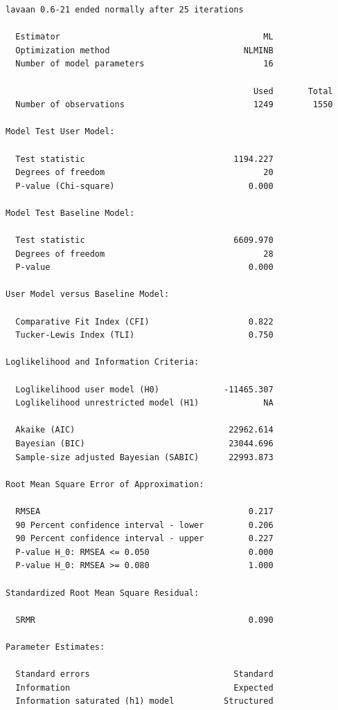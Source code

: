 \documentclass[
  letterpaper,
  DIV=11,
  numbers=noendperiod]{scrartcl}
\begin{document}
\begin{verbatim}
lavaan 0.6-21 ended normally after 25 iterations

  Estimator                                         ML
  Optimization method                           NLMINB
  Number of model parameters                        16

                                                  Used       Total
  Number of observations                          1249        1550

Model Test User Model:
                                                      
  Test statistic                              1194.227
  Degrees of freedom                                20
  P-value (Chi-square)                           0.000

Model Test Baseline Model:

  Test statistic                              6609.970
  Degrees of freedom                                28
  P-value                                        0.000

User Model versus Baseline Model:

  Comparative Fit Index (CFI)                    0.822
  Tucker-Lewis Index (TLI)                       0.750

Loglikelihood and Information Criteria:

  Loglikelihood user model (H0)             -11465.307
  Loglikelihood unrestricted model (H1)             NA
                                                      
  Akaike (AIC)                               22962.614
  Bayesian (BIC)                             23044.696
  Sample-size adjusted Bayesian (SABIC)      22993.873

Root Mean Square Error of Approximation:

  RMSEA                                          0.217
  90 Percent confidence interval - lower         0.206
  90 Percent confidence interval - upper         0.227
  P-value H_0: RMSEA <= 0.050                    0.000
  P-value H_0: RMSEA >= 0.080                    1.000

Standardized Root Mean Square Residual:

  SRMR                                           0.090

Parameter Estimates:

  Standard errors                             Standard
  Information                                 Expected
  Information saturated (h1) model          Structured


\end{verbatim}
\end{document}
